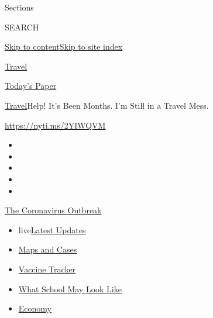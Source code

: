 Sections

SEARCH

\protect\hyperlink{site-content}{Skip to
content}\protect\hyperlink{site-index}{Skip to site index}

\href{https://www.nytimes.com/section/travel}{Travel}

\href{https://myaccount.nytimes.com/auth/login?response_type=cookie\&client_id=vi}{}

\href{https://www.nytimes.com/section/todayspaper}{Today's Paper}

\href{/section/travel}{Travel}\textbar{}Help! It's Been Months. I'm
Still in a Travel Mess.

\url{https://nyti.ms/2YIWQVM}

\begin{itemize}
\item
\item
\item
\item
\item
\end{itemize}

\href{https://www.nytimes.com/news-event/coronavirus?action=click\&pgtype=Article\&state=default\&region=TOP_BANNER\&context=storylines_menu}{The
Coronavirus Outbreak}

\begin{itemize}
\tightlist
\item
  live\href{https://www.nytimes.com/2020/08/01/world/coronavirus-covid-19.html?action=click\&pgtype=Article\&state=default\&region=TOP_BANNER\&context=storylines_menu}{Latest
  Updates}
\item
  \href{https://www.nytimes.com/interactive/2020/us/coronavirus-us-cases.html?action=click\&pgtype=Article\&state=default\&region=TOP_BANNER\&context=storylines_menu}{Maps
  and Cases}
\item
  \href{https://www.nytimes.com/interactive/2020/science/coronavirus-vaccine-tracker.html?action=click\&pgtype=Article\&state=default\&region=TOP_BANNER\&context=storylines_menu}{Vaccine
  Tracker}
\item
  \href{https://www.nytimes.com/interactive/2020/07/29/us/schools-reopening-coronavirus.html?action=click\&pgtype=Article\&state=default\&region=TOP_BANNER\&context=storylines_menu}{What
  School May Look Like}
\item
  \href{https://www.nytimes.com/live/2020/07/31/business/stock-market-today-coronavirus?action=click\&pgtype=Article\&state=default\&region=TOP_BANNER\&context=storylines_menu}{Economy}
\end{itemize}

